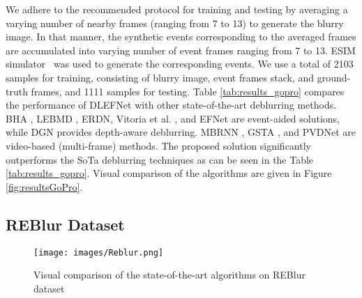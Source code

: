 \documentclass{article}
\begin{document}
We adhere to the recommended protocol for training and testing by averaging a varying number of nearby frames (ranging from 7 to 13) to generate the blurry image. In that manner, the synthetic events corresponding to the averaged frames are accumulated into varying number of  event frames ranging from 7 to 13. 
ESIM simulator~\cite{rebecq2018esim} was used to generate the corresponding events. We use a total of 2103 samples for training, 
consisting of blurry image, event frames stack, and ground-truth frames, and 1111 samples for testing. 
Table \ref{tab:results_gopro} compares the performance of DLEFNet with other state-of-the-art deblurring methods. 
BHA \cite{BHA}, LEBMD \cite{LEBMD}, ERDN, Vitoria et al. \cite{vitoria2023event}, and EFNet \cite{EFNet} are event-aided solutions, 
while DGN \cite{DGN} provides depth-aware deblurring. MBRNN \cite{MBRNN}, GSTA \cite{GSTA}, and PVDNet \cite{PVDNet} are video-based (multi-frame) methods. 
The proposed solution significantly outperforms the SoTa deblurring techniques as can be seen in the Table \ref{tab:results_gopro}. Visual comparison
of the algorithms are given in Figure \ref{fig:resultsGoPro}.

\subsection{REBlur Dataset}
\begin{figure}[ht]
\centering
\texttt{[image: images/Reblur.png]}
\caption{Visual comparison of the state-of-the-art algorithms on REBlur dataset}
\label{fig:resultsReblur}
\end{figure}
\end{document}
